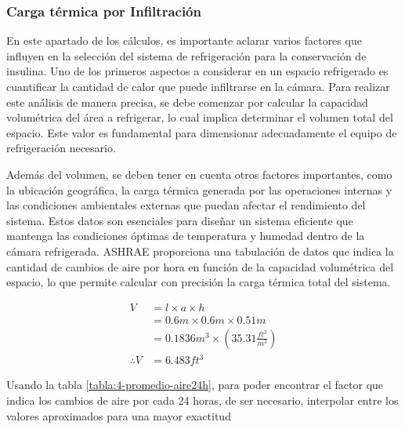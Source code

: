 \subsubsection{Carga térmica por Infiltración}
En este apartado de los cálculos, es importante aclarar varios factores que influyen en la selección del sistema de refrigeración para la conservación de insulina. Uno de los primeros aspectos a considerar en un espacio refrigerado es cuantificar la cantidad de calor que puede infiltrarse en la cámara. Para realizar este análisis de manera precisa, se debe comenzar por calcular la capacidad volumétrica del área a refrigerar, lo cual implica determinar el volumen total del espacio. Este valor es fundamental para dimensionar adecuadamente el equipo de refrigeración necesario.

Además del volumen, se deben tener en cuenta otros factores importantes, como la ubicación geográfica, la carga térmica generada por las operaciones internas y las condiciones ambientales externas que puedan afectar el rendimiento del sistema. Estos datos son esenciales para diseñar un sistema eficiente que mantenga las condiciones óptimas de temperatura y humedad dentro de la cámara refrigerada. ASHRAE proporciona una tabulación de datos que indica la cantidad de cambios de aire por hora en función de la capacidad volumétrica del espacio, lo que permite calcular con precisión la carga térmica total del sistema. 
 
 \begin{equation}
 	\begin{aligned}
 		V&=l\times a\times h\\
 		&=0.6m \times 0.6m\times 0.51m\\
 		&=0.1836 m^3 \times \left(35.31 \frac{ft^3}{m^3}\right)\\
  \therefore V&= 6.483 ft^3 
 	\end{aligned}
 \end{equation}
 
 Usando la tabla \ref{tabla:4-promedio-aire24h}, para poder encontrar el factor que indica los cambios de aire por cada  24 horas, de ser necesario, interpolar entre los valores aproximados para una mayor  exactitud
 
